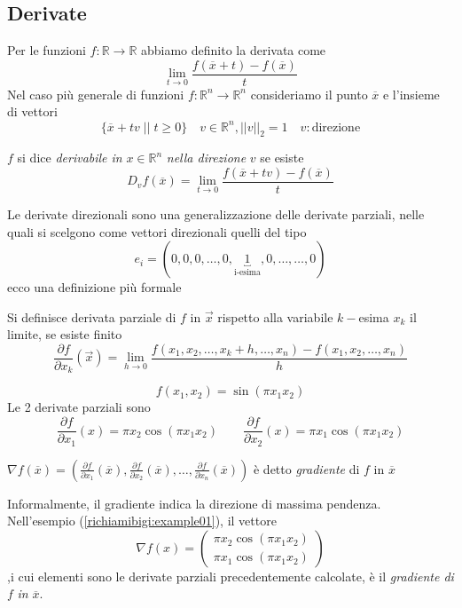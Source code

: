 \subsection{Derivate}
Per le funzioni $f:\mathbb{R} \rightarrow \mathbb{R}$ abbiamo definito
la derivata come
$$ \lim_{t \to 0 } \frac{f(\overline{x} + t) - f(\overline{x})}{t}$$
Nel caso pi\`u generale di funzioni $f:\mathbb{R}^n \rightarrow \mathbb{R}^n$
consideriamo il punto $\overline{x}$ e l'insieme di vettori 
$$ \{ \overline{x} + tv \; | | \; t \geq 0  \} \quad  v \in \mathbb{R}^n, || v||_{2} = 1 \quad v:\text{direzione} $$

\begin{defn}
$f$ si dice \emph{derivabile in} $x \in \mathbb{R}^{n}$ 
\emph{nella direzione} $v$ se esiste
$$D_v f(\overline{x}) = \lim_{t \to 0 } \frac{f(\overline{x} + tv) - f(\overline{x})}{t}$$
\end{defn}

Le derivate direzionali sono una generalizzazione delle derivate
parziali, nelle quali si scelgono come vettori direzionali quelli
del tipo
$$ e_i = (0,0,0,\ldots, 0,\underbracket{1}_{\text{i-esima}},0, \ldots, \ldots, 0) $$
ecco una definizione più formale
\begin{defn}
Si definisce derivata parziale di $f$ in $\vec{x}$ rispetto alla variabile
$k-$esima $x_k$ il limite, se esiste finito
$$\frac{\partial f}{\partial x_k} (\vec{x})=\lim_{h\to 0}\frac{f(x_1,x_2,\ldots,x_k+h,\ldots,x_n)-f(x_1,x_2,\ldots,x_n)}{h}$$
\end{defn}

\begin{example}
\label{richiamibigi:example01}
$$f(x_1,x_2) = \sin(\pi x_1 x_2)  $$
Le 2 derivate parziali sono
$$
\frac{\partial f}{\partial x_1}(x) = \pi x_2 \cos(\pi x_1 x_2)
\qquad
\frac{\partial f}{\partial x_2}(x) = \pi x_1 \cos(\pi x_1 x_2)
$$
\end{example}

\begin{defn}[Gradiente]
$\nabla f(\overline{x}) = 
(\frac{\partial f}{\partial x_1}(\overline{x}),
\frac{\partial f}{\partial x_2}(\overline{x}),
\ldots,
\frac{\partial f}{\partial x_n}(\overline{x}))$
\`e detto \emph{gradiente} di $f$ in $\overline{x}$
\end{defn}
Informalmente, il gradiente indica la direzione di massima pendenza.\\
Nell'esempio (\ref{richiamibigi:example01}),  il vettore
$$ \nabla f(x) = 
\begin{pmatrix}
  \pi x_2 \cos(\pi x_1 x_2) \\
\pi x_1 \cos(\pi x_1 x_2)
\end{pmatrix}
$$
,i cui elementi sono le derivate parziali precedentemente calcolate,
è il \emph{gradiente di} $f$ \emph{in} $\overline{x}$.\\

